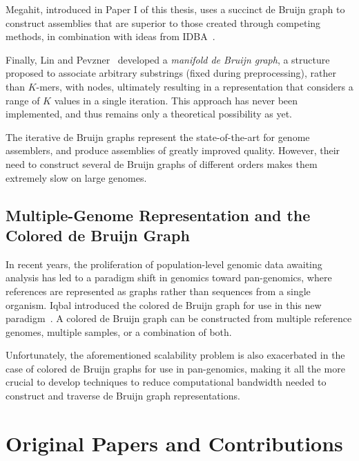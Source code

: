 Megahit, introduced in Paper I of this thesis, uses a succinct de Bruijn graph to construct assemblies that are superior to those created through competing methods, in combination with ideas from IDBA~\cite{megahit}.

Finally, Lin and Pevzner~\cite{mdbg} %
developed a {\em manifold de Bruijn graph}, a structure proposed to associate arbitrary substrings (fixed during preprocessing), rather than $K$-mers, with nodes, ultimately resulting in a representation that considers a range of $K$ values in a single iteration. This approach has never been implemented, and thus remains only a theoretical possibility as yet.

The iterative de Bruijn graphs represent the state-of-the-art for genome assemblers, and produce assemblies of greatly
improved quality. However, their need to construct several de Bruijn graphs of different orders makes them
extremely slow on large genomes.

\subsection{Multiple-Genome Representation and the Colored de Bruijn Graph}
In recent years, the proliferation of population-level genomic data awaiting analysis has led to a paradigm shift in genomics toward pan-genomics, where references are represented as graphs rather than sequences from a single organism. Iqbal introduced the colored de Bruijn graph for use in this new paradigm~\cite{ICTFM12}. %
A colored de Bruijn graph can be constructed from multiple reference genomes, multiple samples, or a combination of both.

Unfortunately, the aforementioned scalability problem is also exacerbated in the case of colored de Bruijn graphs for use in pan-genomics, making it all the more crucial to develop techniques to reduce computational bandwidth needed to construct and traverse de Bruijn graph representations.

\section{Original Papers and Contributions}

